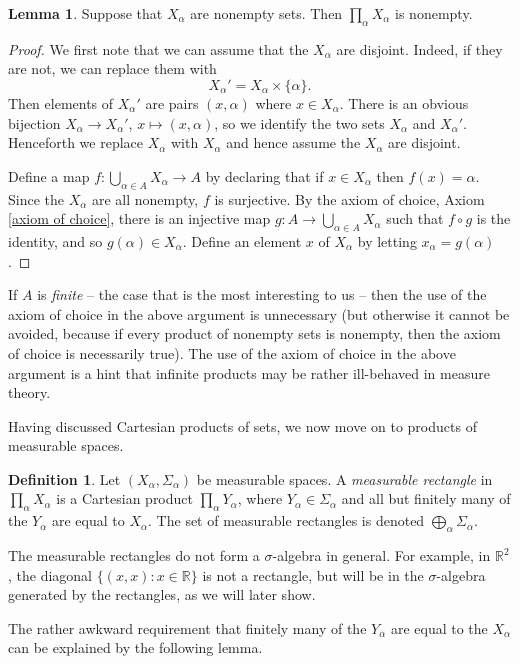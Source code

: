 \documentclass[12pt]{book}
\newcommand{\RR}{\mathbb{R}}
\newcommand{\dfn}[1]{\emph{#1}\index{#1}}
\theoremstyle{definition}
\newtheorem{lemma}[theorem]{Lemma}
\newtheorem{definition}[theorem]{Definition}
\begin{document}
\begin{lemma}
Suppose that $X_\alpha$ are nonempty sets. Then $\prod_\alpha X_\alpha$ is nonempty.
\end{lemma}
\begin{proof}
We first note that we can assume that the $X_\alpha$ are disjoint. Indeed, if they are not, we can replace them with
$$X_\alpha' = X_\alpha \times \{\alpha\}.$$
Then elements of $X_\alpha'$ are pairs $(x, \alpha)$ where $x \in X_\alpha$.
There is an obvious bijection $X_\alpha \to X_\alpha'$, $x \mapsto (x, \alpha)$, so we identify the two sets $X_\alpha$ and $X_\alpha'$.
Henceforth we replace $X_\alpha$ with $X_\alpha$ and hence assume the $X_\alpha$ are disjoint.

Define a map $f: \bigcup_{\alpha \in A} X_\alpha \to A$ by declaring that if $x \in X_\alpha$ then $f(x) = \alpha$.
Since the $X_\alpha$ are all nonempty, $f$ is surjective.
By the axiom of choice, Axiom \ref{axiom of choice}, there is an injective map $g: A \to \bigcup_{\alpha \in A} X_\alpha$ such that $f \circ g$ is the identity, and so $g(\alpha) \in X_\alpha$.
Define an element $x$ of $X_\alpha$ by letting $x_\alpha = g(\alpha)$.
\end{proof}
If $A$ is \emph{finite} -- the case that is the most interesting to us -- then the use of the axiom of choice in the above argument is unnecessary (but otherwise it cannot be avoided, because if every product of nonempty sets is nonempty, then the axiom of choice is necessarily true).
The use of the axiom of choice in the above argument is a hint that infinite products may be rather ill-behaved in measure theory.

Having discussed Cartesian products of sets, we now move on to products of measurable spaces.
\begin{definition}
Let $(X_\alpha, \Sigma_\alpha)$ be measurable spaces.
A \dfn{measurable rectangle} in $\prod_\alpha X_\alpha$ is a Cartesian product $\prod_\alpha Y_\alpha$, where $Y_\alpha \in \Sigma_\alpha$ and all but finitely many of the $Y_\alpha$ are equal to $X_\alpha$.
The set of measurable rectangles is denoted $\bigoplus_\alpha \Sigma_\alpha$.
\end{definition}

The measurable rectangles do not form a $\sigma$-algebra in general.
For example, in $\RR^2$, the diagonal $\{(x, x): x \in \RR\}$ is not a rectangle, but will be in the $\sigma$-algebra generated by the rectangles, as we will later show.

The rather awkward requirement that finitely many of the $Y_\alpha$ are equal to the $X_\alpha$ can be explained by the following lemma.
\end{document}
